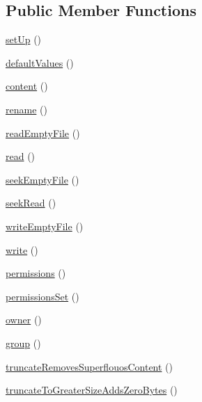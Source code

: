 \subsection*{Public Member Functions}
\begin{DoxyCompactItemize}
\item 
\mbox{\hyperlink{classorg_1_1bovigo_1_1vfs_1_1vfs_stream_file_test_case_a0bc688732d2b3b162ffebaf7812e78da}{set\+Up}} ()
\item 
\mbox{\hyperlink{classorg_1_1bovigo_1_1vfs_1_1vfs_stream_file_test_case_a793367a59a4ecb95c6c35fae5441801b}{default\+Values}} ()
\item 
\mbox{\hyperlink{classorg_1_1bovigo_1_1vfs_1_1vfs_stream_file_test_case_a9b80bb36f89498eac4f43bf08461240d}{content}} ()
\item 
\mbox{\hyperlink{classorg_1_1bovigo_1_1vfs_1_1vfs_stream_file_test_case_a5f13470498476878e37541d041e31b80}{rename}} ()
\item 
\mbox{\hyperlink{classorg_1_1bovigo_1_1vfs_1_1vfs_stream_file_test_case_a2429f289df53507d47b96c927eb1cf81}{read\+Empty\+File}} ()
\item 
\mbox{\hyperlink{classorg_1_1bovigo_1_1vfs_1_1vfs_stream_file_test_case_a64571309bfb3238c65fd3c2898f92440}{read}} ()
\item 
\mbox{\hyperlink{classorg_1_1bovigo_1_1vfs_1_1vfs_stream_file_test_case_a5eb0952405b1893aa3a88824f1f2b20c}{seek\+Empty\+File}} ()
\item 
\mbox{\hyperlink{classorg_1_1bovigo_1_1vfs_1_1vfs_stream_file_test_case_ac0c54c391a879f3185a917183f575e2b}{seek\+Read}} ()
\item 
\mbox{\hyperlink{classorg_1_1bovigo_1_1vfs_1_1vfs_stream_file_test_case_a515af8e946f2b48b7f2a43b7166e4086}{write\+Empty\+File}} ()
\item 
\mbox{\hyperlink{classorg_1_1bovigo_1_1vfs_1_1vfs_stream_file_test_case_aa245791a86f0178986f84c9357339aab}{write}} ()
\item 
\mbox{\hyperlink{classorg_1_1bovigo_1_1vfs_1_1vfs_stream_file_test_case_a11e8d1e60a2c01e214a533f7bf44e872}{permissions}} ()
\item 
\mbox{\hyperlink{classorg_1_1bovigo_1_1vfs_1_1vfs_stream_file_test_case_a8df718c02851465d6fe4a169e3fbbd8c}{permissions\+Set}} ()
\item 
\mbox{\hyperlink{classorg_1_1bovigo_1_1vfs_1_1vfs_stream_file_test_case_a14420fb6943abecf9fcbacf2687e134d}{owner}} ()
\item 
\mbox{\hyperlink{classorg_1_1bovigo_1_1vfs_1_1vfs_stream_file_test_case_ab623e0c8f02b387685ed4a31754f8de1}{group}} ()
\item 
\mbox{\hyperlink{classorg_1_1bovigo_1_1vfs_1_1vfs_stream_file_test_case_a6f20716fec7bacf7ebb3b6f15d85aa62}{truncate\+Removes\+Superflouos\+Content}} ()
\item 
\mbox{\hyperlink{classorg_1_1bovigo_1_1vfs_1_1vfs_stream_file_test_case_a1aa5a7b6c72ceefd965573f4408452be}{truncate\+To\+Greater\+Size\+Adds\+Zero\+Bytes}} ()
\end{DoxyCompactItemize}
